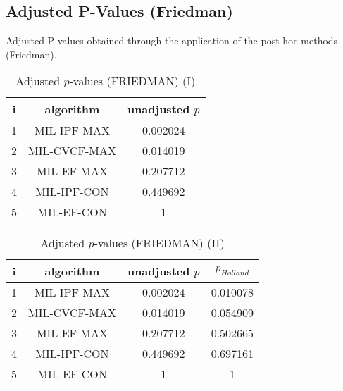 \documentclass[a4paper,10pt]{article}
\begin{document}
\begin{landscape}
\newpage

\section{Adjusted P-Values (Friedman)}


Adjusted P-values obtained through the application of the post hoc methods (Friedman).

\begin{table}[!htp]
\centering\small
\begin{tabular}{ccc}
i&algorithm&unadjusted $p$\\
\hline1&MIL-IPF-MAX&0.002024\\2&MIL-CVCF-MAX&0.014019\\3&MIL-EF-MAX&0.207712\\4&MIL-IPF-CON&0.449692\\5&MIL-EF-CON&1\\\hline
\end{tabular}
\caption{Adjusted $p$-values (FRIEDMAN) (I)}
\end{table}
\begin{table}[!htp]
\centering\small
\begin{tabular}{cccc}
i&algorithm&unadjusted $p$&$p_{Holland}$\\
\hline1&MIL-IPF-MAX&0.002024&0.010078\\2&MIL-CVCF-MAX&0.014019&0.054909\\3&MIL-EF-MAX&0.207712&0.502665\\4&MIL-IPF-CON&0.449692&0.697161\\5&MIL-EF-CON&1&1\\\hline
\end{tabular}
\caption{Adjusted $p$-values (FRIEDMAN) (II)}
\end{table}

\newpage
\end{landscape}
\end{document}
